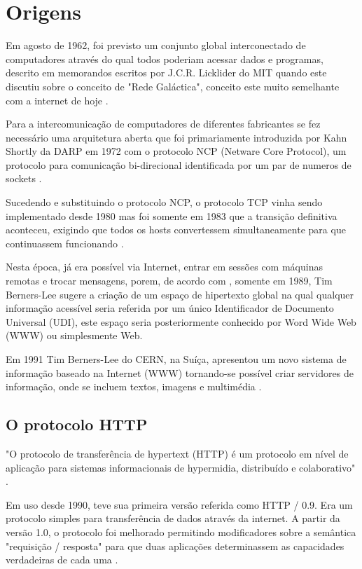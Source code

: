 \section{Origens}

Em agosto de 1962, foi previsto um conjunto global interconectado de computadores através do qual todos poderiam acessar dados e programas, descrito em memorandos escritos por J.C.R. Licklider do MIT quando este discutiu sobre o conceito de "Rede Galáctica", conceito este muito semelhante com a internet de hoje \citep[p.~2]{Leiner2009}.

Para a intercomunicação de computadores de diferentes fabricantes se fez necessário uma arquitetura aberta que foi primariamente introduzida por Kahn Shortly da DARP em 1972 com o protocolo NCP (Netware Core Protocol), um protocolo para comunicação bi-direcional identificada por um par de numeros de sockets \citep[p.~4]{Leiner2009}.

Sucedendo e substituindo o protocolo NCP, o protocolo TCP vinha sendo implementado desde 1980 mas foi somente em 1983 que a transição definitiva aconteceu, exigindo que todos os hosts convertessem simultaneamente para que continuassem funcionando \citep[p.~7]{Leiner2009}.

Nesta época, já era possível via Internet, entrar em sessões com máquinas remotas e trocar mensagens, porem, de acordo com \citet{Aghaei2012}, somente em 1989, Tim Berners-Lee sugere a criação de um espaço de hipertexto global na qual qualquer informação acessível seria referida por um único Identificador de Documento Universal (UDI), este espaço seria posteriormente conhecido por Word Wide Web (WWW) ou simplesmente Web.

 Em 1991 Tim Berners-Lee do CERN, na Suíça, apresentou um novo sistema de informação baseado na Internet (WWW) tornando-se possível criar servidores de informação, onde se incluem textos, imagens e multimédia \citep{goethals2000historia}.
 
\subsection{O protocolo HTTP}
"O protocolo de transferência de hypertext (HTTP) é um protocolo em nível de aplicação para sistemas informacionais de hypermidia, distribuído e colaborativo" \citep[p.~7, Tradução Nossa]{Fielding1999}.

Em uso desde 1990, teve sua primeira versão referida como HTTP / 0.9. Era um protocolo simples para transferência de dados através da internet. A partir da versão 1.0, o protocolo foi melhorado permitindo modificadores sobre a semântica "requisição / resposta" para que duas aplicações determinassem as capacidades verdadeiras de cada uma \citep[p.~7]{Fielding1999}.


